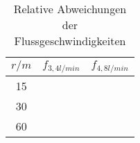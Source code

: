 \begin{table}[h!]
  \centering
  \caption{Relative Abweichungen der Flussgeschwindigkeiten}
  \label{tab:fehler}
  \begin{tabular}{c c c}
    \toprule
      $r/m$  &  $f_{3,4 l/min}$   & $f_{4,8 l/min}$  \\
      \midrule
    15  &      &   \\
    30  &      &   \\
    60  &      &   \\
    \bottomrule
  \end{tabular}
\end{table}

%
